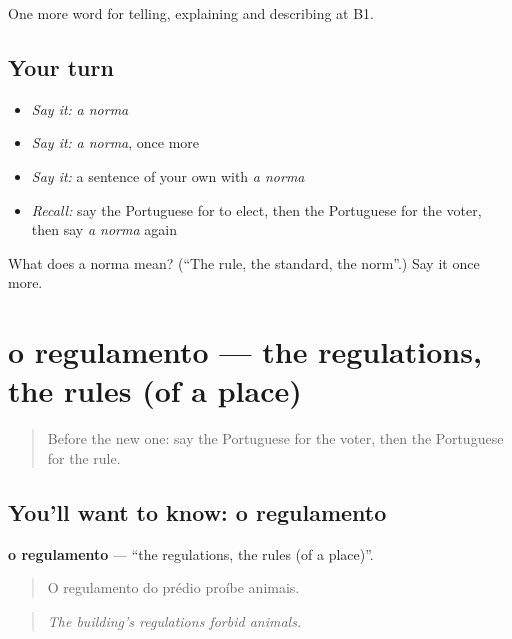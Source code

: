 \begin{grammarlens}[title={What you've built}]
One more word for telling, explaining and describing at B1.
\end{grammarlens}

\subsection*{Your turn}
\begin{itemize}
\raggedright
  \item \emph{Say it:} \emph{a norma}
  \item \emph{Say it:} \emph{a norma}, once more
  \item \emph{Say it:} a sentence of your own with \emph{a norma}
  \item \emph{Recall:} say the Portuguese for to elect, then the Portuguese for the voter, then say \emph{a norma} again
\end{itemize}

\begin{tcolorbox}[breakable,colback=teal!4,colframe=teal!35!black,title={Before you move on}]
What does a norma mean? (\textquotedblleft{}The rule, the standard, the norm\textquotedblright{}.) Say it once more.
\end{tcolorbox}
\section[o regulamento]{o regulamento — the regulations, the rules (of a place)}

\label{lesson:PT-C381-regulamento}



\begin{quote}
Before the new one: say the Portuguese for the voter, then the Portuguese for the rule.
\end{quote}

\subsection*{You'll want to know: o regulamento}
\textbf{o regulamento} — \textquotedblleft{}the regulations, the rules (of a place)\textquotedblright{}.

\begin{quote}
O regulamento do prédio proíbe animais.
\end{quote}

\begin{quote}
\emph{The building's regulations forbid animals.}
\end{quote}

